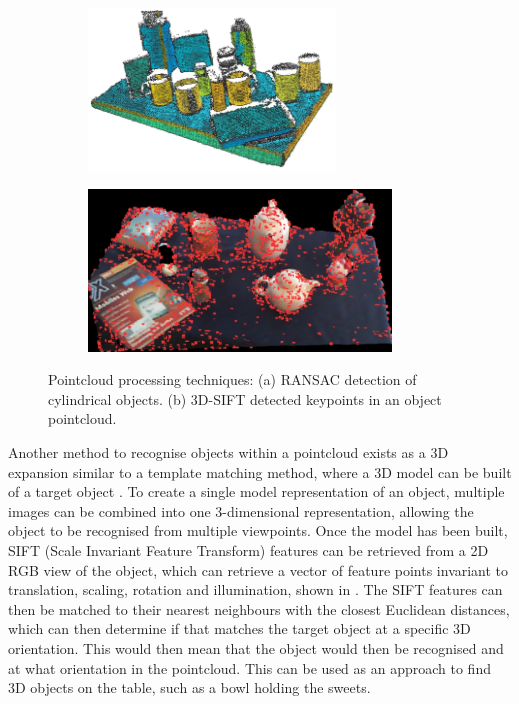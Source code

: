 \begin{figure}[H]
    \captionsetup[figure]{justification=centering}
    \begin{subfigure}[H]{0.475\textwidth}   
        \centering 
        \caption{}
        \includegraphics[width=\textwidth, height=4.3cm]{ransacobjects.png}
        \label{fig:objectransac}
    \end{subfigure}
    \begin{subfigure}[H]{0.475\textwidth}   
        \centering
        \caption{}
        \includegraphics[width=\textwidth, height=4.3cm]{3dsift.png}
        \label{fig:3dsift}
    \end{subfigure}
    \captionsetup{justification=centering}
    \caption{Pointcloud processing techniques: (a) RANSAC detection of cylindrical objects. (b) 3D-SIFT detected keypoints in an object pointcloud.}
\end{figure}
Another method to recognise objects within a pointcloud exists as a 3D expansion similar to a template matching method, where a 3D model can be built of a target object \cite{3dmodels}. To create a single model representation of an object, multiple images can be combined into one 3-dimensional representation, allowing the object to be recognised from multiple viewpoints. Once the model has been built, SIFT (Scale Invariant Feature Transform) features can be retrieved from a 2D RGB view of the object, which can retrieve a vector of feature points invariant to translation, scaling, rotation and illumination, shown in \textbf{}. The SIFT features can then be matched to their nearest neighbours with the closest Euclidean distances, which can then determine if that matches the target object at a specific 3D orientation. This would then mean that the object would then be recognised and at what orientation in the pointcloud. This can be used as an approach to find 3D objects on the table, such as a bowl holding the sweets.
